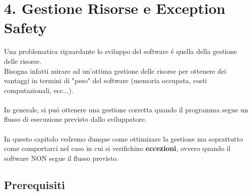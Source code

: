 \documentclass{article}
\begin{document}
\section*{\textcolor{blu}{4. Gestione Risorse e Exception Safety}} 
Una problematica riguardante lo sviluppo del software \'e quella della gestione delle risorse.\\Bisogna infatti mirare ad un'ottima gestione delle risorse per ottenere dei vantaggi in termini di "peso" del software (memoria occupata, costi computazionali, ecc...).\\
\\ In generale, si pu\'o ottenere una gestione corretta quando il programma segue un flusso di esecuzione previsto dallo sviluppatore.\\
\\In questo capitolo vedremo dunque come ottimizare la gestione ma soprattutto come comportarci nel caso in cui si verifichino \textbf{eccezioni}, ovvero quando il software NON segue il flusso previsto.
\textcolor{grigio}{\section*{Prerequisiti \\}} 
\end{document}
